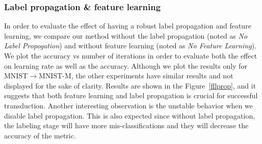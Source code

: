 \subsubsection{Label propagation \& feature learning}
In order to evaluate the effect of having a robust label propagation and feature learning, we compare our method without the label propagation (noted as \emph{No Label Propogation}) and without feature learning (noted as \emph{No Feature Learning}). We plot the accuracy vs number of iterations in order to evaluate both the effect on learning rate as well as the accuracy. Although we plot the results only for MNIST$\rightarrow$MNIST-M, the other experiments have similar results and not displayed for the sake of clarity.  Results are shown in the Figure~\ref{fllprop}, and it suggests that both feature learning and label propagation is crucial for successful transduction. Another interesting observation is the unstable behavior when we disable label propagation. This is also expected since without label propagation, the labeling stage will have more mis-classifications and they will decrease the accuracy of the metric.

